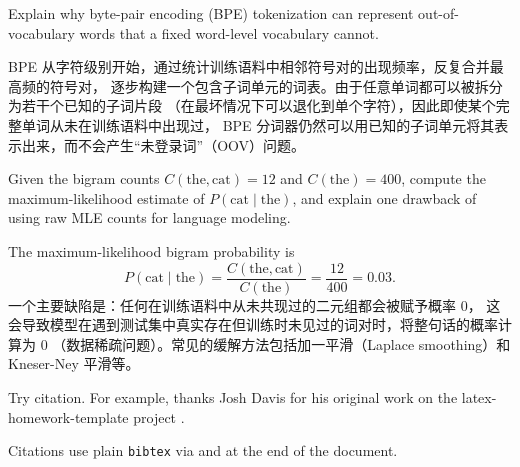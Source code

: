 \documentclass{homework}
\begin{document}
\maketitle
\if{}
    \pagebreak
\fi

\begin{homeworkProblem}
Explain why byte-pair encoding (BPE) tokenization can represent
out-of-vocabulary words that a fixed word-level vocabulary cannot.

\solution
BPE 从字符级别开始，通过统计训练语料中相邻符号对的出现频率，反复合并最高频的符号对，
逐步构建一个包含子词单元的词表。由于任意单词都可以被拆分为若干个已知的子词片段
（在最坏情况下可以退化到单个字符），因此即使某个完整单词从未在训练语料中出现过，
BPE 分词器仍然可以用已知的子词单元将其表示出来，而不会产生“未登录词”（OOV）问题。
\end{homeworkProblem}

\begin{homeworkProblem}
Given the bigram counts $C(\text{the}, \text{cat}) = 12$ and
$C(\text{the}) = 400$, compute the maximum-likelihood estimate of
$P(\text{cat} \mid \text{the})$, and explain one drawback of using raw
MLE counts for language modeling.

\solution
The maximum-likelihood bigram probability is
\begin{equation}
    P(\text{cat} \mid \text{the}) = \frac{C(\text{the}, \text{cat})}{C(\text{the})}
    = \frac{12}{400} = 0.03.
\end{equation}
一个主要缺陷是：任何在训练语料中从未共现过的二元组都会被赋予概率 0，
这会导致模型在遇到测试集中真实存在但训练时未见过的词对时，将整句话的概率计算为 0
（数据稀疏问题）。常见的缓解方法包括加一平滑（Laplace smoothing）和 Kneser-Ney 平滑等。
\end{homeworkProblem}

\begin{homeworkProblem}
Try citation. For example, thanks Josh Davis for his original work on
the latex-homework-template project \cite{LatexHomeworkTemplate}.

\solution
Citations use plain \verb|bibtex| via \verb||
and \verb|| at the end of the document.
\end{homeworkProblem}



\end{document}
